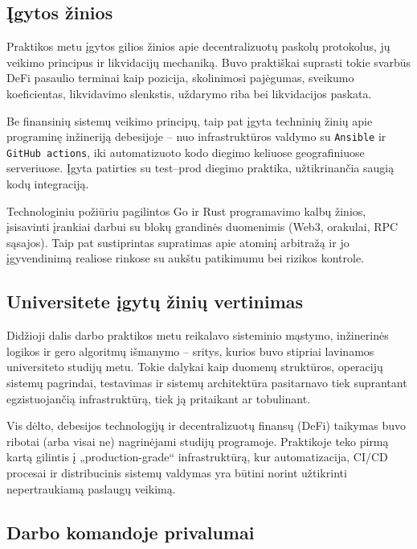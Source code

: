 \documentclass[]{VUMIFTemplateClass}
\begin{document}
\subsection{Įgytos žinios}

Praktikos metu įgytos gilios žinios apie decentralizuotų paskolų protokolus, jų veikimo principus ir likvidacijų mechaniką. Buvo praktiškai suprasti tokie svarbūs DeFi pasaulio terminai kaip pozicija, skolinimosi pajėgumas, sveikumo koeficientas, likvidavimo slenkstis, uždarymo riba bei likvidacijos paskata.

Be finansinių sistemų veikimo principų, taip pat įgyta techninių žinių apie programinę inžineriją debesijoje – nuo infrastruktūros valdymo su \texttt{Ansible} ir \texttt{GitHub actions}, iki automatizuoto kodo diegimo keliuose geografiniuose serveriuose. Įgyta patirties su test–prod diegimo praktika, užtikrinančia saugią kodų integraciją.

Technologiniu požiūriu pagilintos Go ir Rust programavimo kalbų žinios, įsisavinti įrankiai darbui su blokų grandinės duomenimis (Web3, orakulai, RPC sąsajos). Taip pat sustiprintas supratimas apie atominį arbitražą ir jo įgyvendinimą realiose rinkose su aukštu patikimumu bei rizikos kontrole.

\subsection{Universitete įgytų žinių vertinimas}

Didžioji dalis darbo praktikos metu reikalavo sisteminio mąstymo, inžinerinės logikos ir gero algoritmų išmanymo – sritys, kurios buvo stipriai lavinamos universiteto studijų metu. Tokie dalykai kaip duomenų struktūros, operacijų sistemų pagrindai, testavimas ir sistemų architektūra pasitarnavo tiek suprantant egzistuojančią infrastruktūrą, tiek ją pritaikant ar tobulinant.

Vis dėlto, debesijos technologijų ir decentralizuotų finansų (DeFi) taikymas buvo ribotai (arba visai ne) nagrinėjami studijų programoje. Praktikoje teko pirmą kartą gilintis į „production-grade“ infrastruktūrą, kur automatizacija, CI/CD procesai ir distribucinis sistemų valdymas yra būtini norint užtikrinti nepertraukiamą paslaugų veikimą.

\subsection{Darbo komandoje privalumai}
\end{document}
